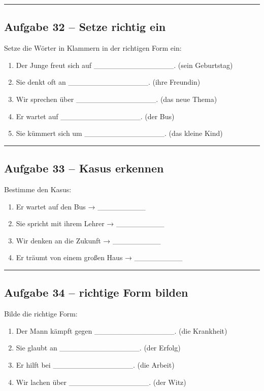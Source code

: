 \documentclass[a4paper,12pt]{article}
\newcommand{\linie}{\vspace{4pt}\hrule\vspace{10pt}}
\begin{document}
\linie

\subsection*{Aufgabe 32 – Setze richtig ein}

Setze die Wörter in Klammern in der richtigen Form ein:

\begin{enumerate}
\item Der Junge freut sich auf \_\_\_\_\_\_\_\_\_\_\_\_\_\_\_. (sein Geburtstag)
\item Sie denkt oft an \_\_\_\_\_\_\_\_\_\_\_\_\_\_\_. (ihre Freundin)
\item Wir sprechen über \_\_\_\_\_\_\_\_\_\_\_\_\_\_\_. (das neue Thema)
\item Er wartet auf \_\_\_\_\_\_\_\_\_\_\_\_\_\_\_. (der Bus)
\item Sie kümmert sich um \_\_\_\_\_\_\_\_\_\_\_\_\_\_\_. (das kleine Kind)
\end{enumerate}

\linie

\subsection*{Aufgabe 33 – Kasus erkennen}

Bestimme den Kasus:

\begin{enumerate}
\item Er wartet auf den Bus → \_\_\_\_\_\_\_\_\_
\item Sie spricht mit ihrem Lehrer → \_\_\_\_\_\_\_\_\_
\item Wir denken an die Zukunft → \_\_\_\_\_\_\_\_\_
\item Er träumt von einem großen Haus → \_\_\_\_\_\_\_\_\_
\end{enumerate}

\linie

\subsection*{Aufgabe 34 – richtige Form bilden}

Bilde die richtige Form:

\begin{enumerate}
\item Der Mann kämpft gegen \_\_\_\_\_\_\_\_\_\_\_\_\_\_\_. (die Krankheit)
\item Sie glaubt an \_\_\_\_\_\_\_\_\_\_\_\_\_\_\_. (der Erfolg)
\item Er hilft bei \_\_\_\_\_\_\_\_\_\_\_\_\_\_\_. (die Arbeit)
\item Wir lachen über \_\_\_\_\_\_\_\_\_\_\_\_\_\_\_. (der Witz)
\end{enumerate}
\end{document}
